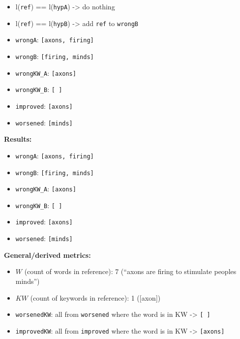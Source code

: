 \documentclass[]{article}
\providecommand{\tightlist}{%
  \setlength{\itemsep}{0pt}\setlength{\parskip}{0pt}}
\begin{document}
\begin{itemize}
  \begin{itemize}
  \tightlist
  \item
    l(\texttt{ref}) == l(\texttt{hypA}) -\textgreater{} do nothing
  \item
    l(\texttt{ref}) == l(\texttt{hypB}) -\textgreater{} add \texttt{ref}
    to \texttt{wrongB}
  \item
    \texttt{wrongA}: \texttt{{[}axons,\ firing{]}}
  \item
    \texttt{wrongB}: \texttt{{[}firing,\ minds{]}}
  \item
    \texttt{wrongKW\_A}: \texttt{{[}axons{]}}
  \item
    \texttt{wrongKW\_B}: \texttt{{[}\ {]}}
  \item
    \texttt{improved}: \texttt{{[}axons{]}}
  \item
    \texttt{worsened}: \texttt{{[}minds{]}}
  \end{itemize}
\end{itemize}

\textbf{Results:}

\begin{itemize}
\tightlist
\item
  \texttt{wrongA}: \texttt{{[}axons,\ firing{]}}
\item
  \texttt{wrongB}: \texttt{{[}firing,\ minds{]}}
\item
  \texttt{wrongKW\_A}: \texttt{{[}axons{]}}
\item
  \texttt{wrongKW\_B}: \texttt{{[}\ {]}}
\item
  \texttt{improved}: \texttt{{[}axons{]}}
\item
  \texttt{worsened}: \texttt{{[}minds{]}}
\end{itemize}

\textbf{General/derived metrics:}

\begin{itemize}
\tightlist
\item
  \(W\) (count of words in reference): 7 (``axons are firing to
  stimulate peoples minds'')
\item
  \(KW\) (count of keywords in reference): 1 ({[}axon{]})
\item
  \texttt{worsenedKW}: all from \texttt{worsened} where the word is in
  KW -\textgreater{} \texttt{{[}\ {]}}
\item
  \texttt{improvedKW}: all from \texttt{improved} where the word is in
  KW -\textgreater{} \texttt{{[}axons{]}}
\end{itemize}
\end{document}
